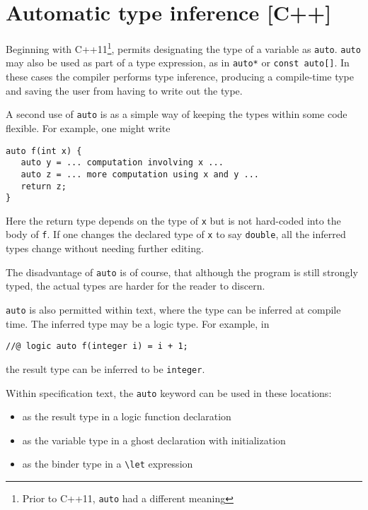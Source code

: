 \section{Automatic type inference [C++]}
\label{sec:auto}

Beginning with C++11\footnote{Prior to C++11, \lstinline|auto| had a different meaning}, \lang{} permits designating the type of a variable as
\lstinline|auto|.
 \lstinline|auto| may also be used as part of a type expression, as in \lstinline|auto*| or \lstinline|const auto[]|. In these cases the compiler performs type inference, producing a compile-time type and
saving the user from having to write out the type.

A second use of \lstinline|auto| is as a simple way of keeping the types
within some code flexible. For example, one might write
\begin{lstlisting}
auto f(int x) {
   auto y = ... computation involving x ...
   auto z = ... more computation using x and y ...
   return z;
}
\end{lstlisting}
Here the return type depends on the type of \lstinline|x| but is not hard-coded into the body of \lstinline|f|. If one changes the declared type of
\lstinline|x| to say \lstinline|double|, all the inferred types change without needing further editing.

The disadvantage of \lstinline|auto| is of course, that although the 
program is still strongly typed, the actual types are harder for the reader to discern.

\lstinline|auto| is also permitted within \NAME{} text, where the type can be inferred at compile time. The inferred type may be a logic type. For example, in
\begin{lstlisting}
//@ logic auto f(integer i) = i + 1;
\end{lstlisting}
the result type can be inferred to be \lstinline|integer|.

Within \NAME{} specification text, the \lstinline|auto| keyword can be used in these locations:
\begin{itemize}
	\item as the result type in a logic function declaration
	\item as the variable type in a ghost declaration with initialization
	\item as the binder type in a \lstinline|\let| expression
\end{itemize}



